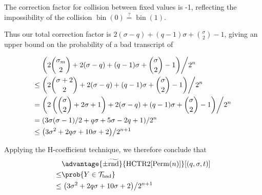 \documentclass[letterpaper,11pt]{article}
\newcommand*{\qeq}{\stackrel{\text{?}}{=}}
\newcommand*{\Tb}{\mathcal{T}_\mathrm{bad}}
\DeclareMathOperator{\fromint}{bin}
\DeclareMathOperator{\HCTR}{HCTR2}
\DeclareMathOperator{\Perm}{Perm}
\begin{document}
The correction factor for collision between fixed values
is -1, reflecting the impossibility of the collision
\(\fromint(0) \qeq \fromint(1)\).

Thus our total correction factor is
\(2(\sigma - q) + (q-1)\sigma + \binom{\sigma}{2} -1\), 
giving an upper bound
on the probability of a bad transcript of

\begin{align*}
    & \left.\left(2\binom{\sigma_m}{2} + 2(\sigma - q) + (q-1)\sigma + \binom{\sigma}{2} -1\right)\middle/2^n\right. \\
    \leq & \left.\left(2\binom{\sigma + 2}{2} + 2(\sigma - q) + (q-1)\sigma + \binom{\sigma}{2} -1\right)\middle/2^n\right. \\
    = & \left.\left(2\left(\binom{\sigma}{2} + 2\sigma + 1\right) + 2(\sigma - q) + (q-1)\sigma + \binom{\sigma}{2} -1\right)\middle/2^n\right. \\
    = & \left.\left(3\sigma(\sigma - 1)/2 + q\sigma + 5\sigma - 2q + 1\right)\middle/2^n\right. \\
    \leq & \left.\left(3\sigma^2 + 2q\sigma + 10\sigma + 2\right)\middle/2^{n+1}\right. \\
\end{align*}

Applying the H-coefficient technique, we therefore conclude that
\begin{align*}
    & \advantage{\pm\widetilde{\mathrm{rnd}}}{\HCTR[\Perm(n)]}[(q, \sigma, t)] \\
    \leq & \prob{Y \in \Tb} \\
    \leq & \left.\left(3\sigma^2 + 2q\sigma + 10\sigma + 2\right)\middle/2^{n+1}\right.
\end{align*}
\end{document}
